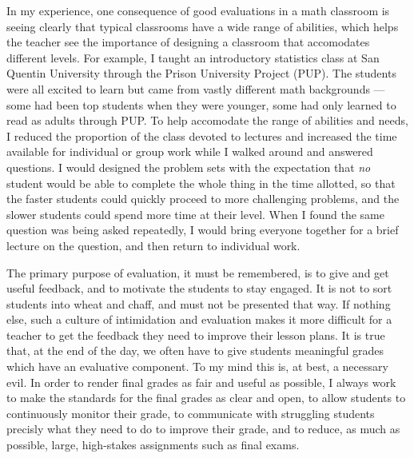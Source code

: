 In my experience, one consequence of good evaluations in a math classroom is
seeing clearly that typical classrooms have a wide range of abilities, which
helps the teacher see the importance of designing a classroom that accomodates
different levels. For example, I taught an introductory statistics class at San
Quentin University through the Prison University Project (PUP).  The students
were all excited to learn but came from vastly different math backgrounds ---
some had been top students when they were younger, some had only learned to read
as adults through PUP.  To help accomodate the range of abilities and needs, I
reduced the proportion of the class devoted to lectures and increased the time
available for individual or group work while I walked around and answered
questions.  I would designed the problem sets with the expectation that
\emph{no} student would be able to complete the whole thing in the time
allotted, so that the faster students could quickly proceed to more challenging
problems, and the slower students could spend more time at their level.  When I
found the same question was being asked repeatedly, I would bring everyone
together for a brief lecture on the question, and then return to individual
work.

The primary purpose of evaluation, it must be remembered, is to give and get
useful feedback, and to motivate the students to stay engaged.  It is not to
sort students into wheat and chaff, and must not be presented that way.  If
nothing else, such a culture of intimidation and evaluation makes it more
difficult for a teacher to get the feedback they need to improve their lesson
plans.  It is true that, at the end of the day, we often have to give students
meaningful grades which have an evaluative component.  To my mind this is, at
best, a necessary evil.  In order to render final grades as fair and useful as
possible, I always work to make the standards for the final grades as clear and
open, to allow students to continuously monitor their grade, to communicate with
struggling students precisly what they need to do to improve their grade, and to
reduce, as much as possible, large, high-stakes assignments such as final exams.




